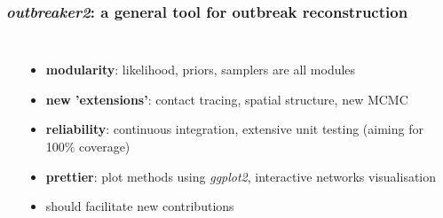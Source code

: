 \documentclass[xcolor=svgnames,mathserif]{beamer}
\begin{document}
\begin{frame}[fragile]
  \frametitle{\textit{outbreaker2}: a general tool for outbreak reconstruction}
  
\begin{columns}[c c]
  
\begin{center}
\end{center}

\pause

  \small
\begin{itemize}
\item \textbf{modularity}: likelihood, priors, samplers are all modules\pause
\item \textbf{new 'extensions'}: contact tracing, spatial structure, new MCMC\pause
\item \textbf{reliability}: continuous integration, extensive unit testing (aiming for 100\% coverage)\pause
\item \textbf{prettier}: plot methods using \textit{ggplot2}, interactive networks visualisation\pause
\item should \alert{facilitate new contributions}
\end{itemize}

\end{columns}


\end{frame}
\end{document}
